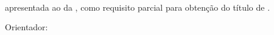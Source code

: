 

	\thispagestyle{empty}

	\begin{center}
		\por%
	\end{center}
	
	\vfill %
	
	\begin{center}
		\textbf{\monog}\\ %
		\textbf{\subtitulo} %
	\end{center}
	
	\vfill %
	
	\begin{flushright}
		\begin{minipage}{9cm} %
			 {\tipo} apresentada ao {\curso} da {\univ}, \hspace{0.2cm}como \hspace{0.1cm} requisito parcial para obtenção do título de {\grau}.\par %
			\vspace{1cm}
			Orientador: {\profOrientador} %
		\end{minipage}
	\end{flushright}
	
	\vfill %
	
	\begin{center}
		\cidade\\ %
		\ano %
	\end{center}
	
	\newpage %


%
%
%  
